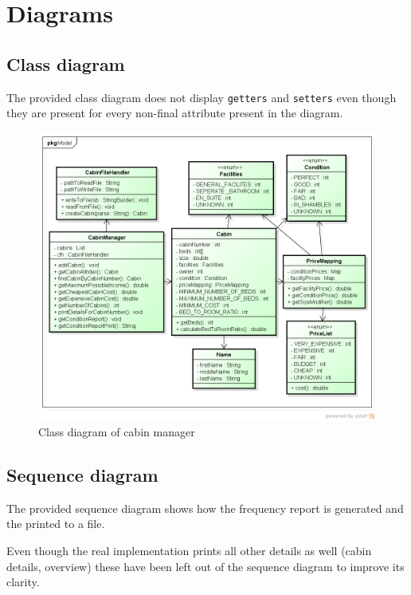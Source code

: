 \chapter{Diagrams}\label{ch:diagrams}

\section{Class diagram}
\label{sec:class_diagram}

The provided class diagram does not display \texttt{getters} and \texttt{setters} even though they are present for every non-final attribute present in the diagram.

\begin{figure}[H]
  \begin{center}
    \includegraphics[width=\textwidth]{gfx/class_diagram.png}
  \caption{Class diagram of cabin manager}
  \end{center}
\end{figure}

\section{Sequence diagram}
\label{sec:sequence_diagram}

The provided sequence diagram shows how the frequency report is generated and the printed to a file.

Even though the real implementation prints all other details as well (cabin details, overview) these have been left out of the sequence diagram to improve its clarity.

